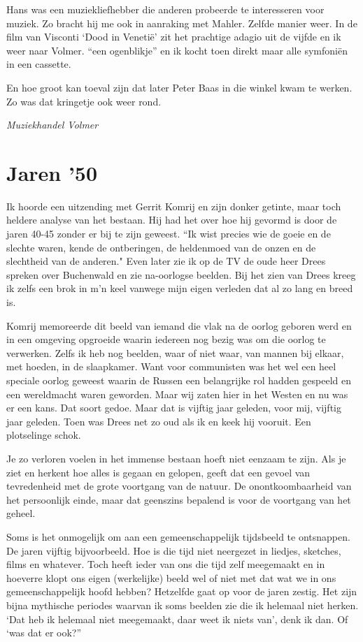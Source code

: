\documentclass[10pt,twoside,openright]{memoir}
\begin{document}
Hans was een muziekliefhebber die anderen probeerde te interesseren voor muziek. Zo bracht hij me ook in aanraking met Mahler. Zelfde manier weer. In de film van Visconti ‘Dood in Venetië’ zit het prachtige adagio uit de vijfde en ik weer naar Volmer. “een ogenblikje” en ik kocht toen direkt maar alle symfoniën in een cassette.

En hoe groot kan toeval zijn dat later Peter Baas in die winkel kwam te werken. Zo was dat kringetje ook weer rond. 

\emph{Muziekhandel Volmer}

\chapter{Jaren '50} %
\label{cha:jaren50}

Ik hoorde een uitzending met Gerrit Komrij en zijn donker getinte, maar toch heldere analyse van het bestaan. Hij had het over hoe hij gevormd is door de jaren 40-45 zonder er bij te zijn geweest. “Ik wist precies wie de goeie en de slechte waren, kende de ontberingen, de heldenmoed van de onzen en de slechtheid van de anderen." Even later zie ik op de TV de oude heer Drees spreken over Buchenwald en zie na-oorlogse beelden. Bij het zien van Drees kreeg ik zelfs een brok in m’n keel vanwege mijn eigen verleden dat al zo lang en breed is. 

Komrij memoreerde dit beeld van iemand die vlak na de oorlog geboren werd en in een omgeving opgroeide waarin iedereen nog bezig was om die oorlog te verwerken. Zelfs ik heb nog beelden, waar of niet waar, van mannen bij elkaar, met hoeden, in de slaapkamer. Want voor communisten was het wel een heel speciale oorlog geweest waarin de Russen een belangrijke rol hadden gespeeld en een wereldmacht waren geworden. Maar wij zaten hier in het Westen en nu was er een kans. Dat soort gedoe. Maar dat is vijftig jaar geleden, voor mij, vijftig jaar geleden. Toen was Drees net zo oud als ik en keek hij vooruit. Een plotselinge schok.

Je zo verloren voelen in het immense bestaan hoeft niet eenzaam te zijn. Als je ziet en herkent hoe alles is gegaan en gelopen, geeft dat een gevoel van tevredenheid met de grote voortgang van de natuur. De onontkoombaarheid van het persoonlijk einde, maar dat geenszins bepalend is voor de voortgang van het geheel.

Soms is het onmogelijk om aan een gemeenschappelijk tijdsbeeld te ontsnappen. De jaren vijftig bijvoorbeeld. Hoe is die tijd niet neergezet in liedjes, sketches, films en whatever. Toch heeft ieder van ons die tijd zelf meegemaakt en in hoeverre klopt ons eigen (werkelijke) beeld wel of niet met dat wat we in ons gemeenschappelijk hoofd hebben? Hetzelfde gaat op voor de jaren zestig. Het zijn bijna mythische periodes waarvan ik soms beelden zie die ik helemaal niet herken. ‘Dat heb ik helemaal niet meegemaakt, daar weet ik niets van’, denk ik dan. Of ‘was dat er ook?”
\end{document}
